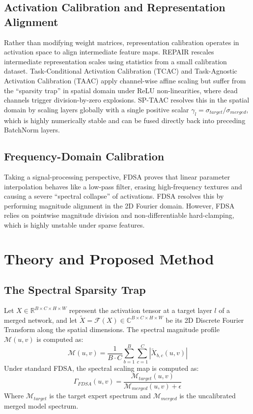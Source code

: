 \documentclass{article}
\theoremstyle{plain}
\theoremstyle{definition}
\theoremstyle{remark}
\begin{document}
\subsection{Activation Calibration and Representation Alignment}
Rather than modifying weight matrices, representation calibration operates in activation space to align intermediate feature maps. REPAIR \cite{jordan2022repair} rescales intermediate representation scales using statistics from a small calibration dataset. Task-Conditional Activation Calibration (TCAC) and Task-Agnostic Activation Calibration (TAAC) apply channel-wise affine scaling but suffer from the ``sparsity trap'' in spatial domain under ReLU non-linearities, where dead channels trigger division-by-zero explosions. SP-TAAC \cite{submission9} resolves this in the spatial domain by scaling layers globally with a single positive scalar $\gamma_l = \sigma_{target}/ \sigma_{merged}$, which is highly numerically stable and can be fused directly back into preceding BatchNorm layers.

\subsection{Frequency-Domain Calibration}
Taking a signal-processing perspective, FDSA \cite{submission10} proves that linear parameter interpolation behaves like a low-pass filter, erasing high-frequency textures and causing a severe ``spectral collapse'' of activations. FDSA resolves this by performing magnitude alignment in the 2D Fourier domain. However, FDSA relies on pointwise magnitude division and non-differentiable hard-clamping, which is highly unstable under sparse features.

\section{Theory and Proposed Method}
\label{sec:theory}

\subsection{The Spectral Sparsity Trap}
Let $X \in \mathbb{R}^{B \times C \times H \times W}$ represent the activation tensor at a target layer $l$ of a merged network, and let $\tilde{X} = \mathcal{F}(X) \in \mathbb{C}^{B \times C \times H \times W}$ be its 2D Discrete Fourier Transform along the spatial dimensions. The spectral magnitude profile $\mathcal{M}(u, v)$ is computed as:
\begin{equation}
  \mathcal{M}(u, v) = \frac{1}{B \cdot C} \sum_{b=1}^B \sum_{c=1}^C |\tilde{X}_{b, c}(u, v)|
\end{equation}
Under standard FDSA, the spectral scaling map is computed as:
\begin{equation}
  \Gamma_{FDSA}(u, v) = \frac{\mathcal{M}_{target}(u, v)}{\mathcal{M}_{merged}(u, v) + \epsilon}
\end{equation}
Where $\mathcal{M}_{target}$ is the target expert spectrum and $\mathcal{M}_{merged}$ is the uncalibrated merged model spectrum.
\end{document}
